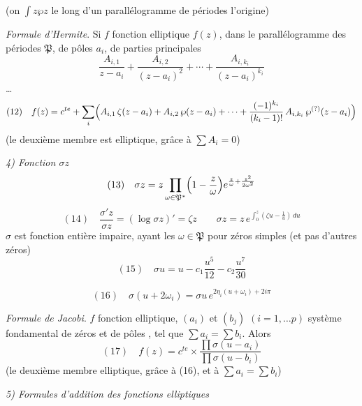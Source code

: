 \documentclass[11pt,a4paper]{article}
\begin{document}
(on  $\int z\wp z$ le long d'un parallélogramme de
périodes  l'origine)

\emph{Formule d'Hermite}. Si $f$ \ill{} fonction elliptique $f(z)$, dans le
parallélogramme des périodes $\mathfrak{P}$, \ill{}  de
pôles $a_i$, de parties principales
\[
\frac{A_{i,1}}{z-a_i} + \frac{A_{i,2}}{(z-a_i)^2} + \cdots +
\frac{A_{i,k_i}}{(z-a_i)^{k_i}}
\]
\ldots
{}
\[
(12)\quad f(z) = c^{te} + \sum_i \Bigl(A_{i,1}\,\zeta(z-a_i) + A_{i,2}\,\wp(z-a_i)
+ \cdots + \frac{(-1)^{k_i}}{(k_i-1)!}\,A_{i,k_i}\,\wp^{(?)}(z-a_i)\Bigr)
\]
(le deuxième membre est elliptique, grâce à $\sum A_i = 0$)

\emph{4) Fonction $\sigma z$}
\[
(13)\quad \sigma z = z \prod_{\omega\in\mathfrak{P}^*}
\Bigl(1 - \frac{z}{\omega}\Bigr) e^{\frac{z}{\omega} + \frac{z^2}{2\omega^2}}
\]
\[
(14)\quad \frac{\sigma' z}{\sigma z} = (\log\sigma z)' = \zeta z \qquad
\sigma z = z\, e^{\int_0^z (\zeta u - \frac{1}{u})\,du}
\]
$\sigma$ est fonction entière impaire, ayant les $\omega\in\mathfrak{P}$ pour
\struck{\ill{}} zéros simples (et pas d'autres zéros)
\[
(15)\quad \sigma u = u - c_1\frac{u^5}{12} - c_2\frac{u^7}{30}
\]

\[
(16)\quad \sigma(u+2\omega_i) = \sigma u\, e^{2\eta_i(u+\omega_i) + 2i\pi}
\]

\emph{Formule de Jacobi}. $f$ fonction elliptique, $(a_i)$ et $(b_j)$
$(i=1,\ldots p)$ système fondamental de zéros et de pôles
, tel que
$\sum a_i = \sum b_i$. Alors
\[
(17)\quad f(z) = c^{te}\times\frac{\prod\sigma(u-a_i)}{\prod\sigma(u-b_i)}
\]
(le deuxième membre  elliptique, grâce à (16), et à
$\sum a_i = \sum b_i$)

\emph{5) Formules d'addition des fonctions elliptiques}
\end{document}
